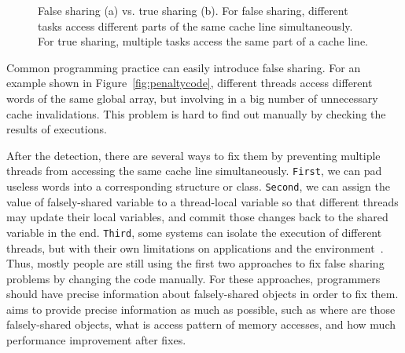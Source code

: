 \begin{figure}[htbp]
\centering
{}%
\hspace{30pt}
%
\caption{False sharing (a) vs. true sharing (b). For false sharing, different tasks access different parts of the same cache line simultaneously. For true sharing, multiple tasks access the same part of a cache line.\label{fig:falsesharing}}
\end{figure}

Common programming practice can easily introduce false sharing. For an example shown in Figure~\ref{fig:penaltycode}, different threads access different words of the same global array, but involving in a big number of unnecessary cache invalidations. This problem is hard to find out manually by checking the results of executions.  

After the detection, there are several ways to fix them by preventing multiple threads from accessing the same cache line simultaneously. {\tt First},  we can pad useless words into a corresponding structure or class. {\tt Second}, we can assign the value of falsely-shared variable to a thread-local variable so that different threads may update their local variables, and commit those changes back to the shared variable in the end. {\tt Third},  some systems can isolate the execution of different threads, but with their own limitations on applications and the environment~\cite{Sheriff, OSdetection}. 
Thus, mostly people are still using the first two approaches to fix false sharing problems by changing the code manually. For these approaches, programmers should have precise information about falsely-shared objects in order to fix them. \cheetah{} aims to provide precise information as much as possible, such as where are those falsely-shared objects, what is access pattern of memory accesses, and how much performance improvement after fixes. 


